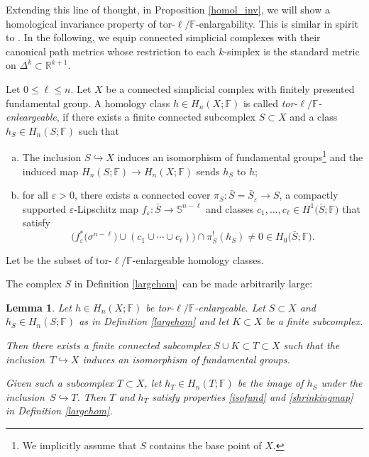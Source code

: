 \documentclass[pdftex]{sigma}
\numberwithin{equation}{section}
\newtheorem{Lemma}[Theorem]{Lemma}
\newcommand{\F}{\mathbb{F}}
\newcommand{\R}{\mathbb{R}}
\newcommand{\SSS}{\mathbb{S}}
\newcommand{\eps}{\varepsilon}
\begin{document}
Extending this line of thought, in Proposition \ref{homol_inv}, we will show a homological invariance property of tor-$\ell / \F$-enlargability.
This is similar in spirit to \cite[Section 3]{BH10}.
In the following, we equip connected simplicial complexes with their canonical path metrics whose restriction to each $k$-simplex is the standard metric on $\Delta^k \subset \R^{k+1}$.

\begin{Definition} \label{largehom}
Let $0 \leq \ell \leq n$.
Let $X$ be a connected simplicial complex with finitely presented fundamental group.
A homology class $h \in H_n(X; \F)$ is called {\em tor-$\ell / \F$-enleargeable}, if there exists a finite connected subcomplex $S \subset X$ and a class $h_S \in H_n(S; \F)$ such that
\begin{enumerate}[(a)]\itemsep=0pt
\item \label{isofund} The inclusion $S \hookrightarrow X$ induces an isomorphism of fundamental groups\footnote{We implicitly assume that $S$ contains the base point of $X$.} and the induced map $H_n(S ; \F) \to H_n(X; \F)$ sends $h_S$ to $h$;
\item \label{shrinkingmap} for all $\eps > 0$, there exists a connected cover $\pi_S \colon \bar S = \bar S_\eps \to S$, a compactly supported $\eps$-Lipschitz map $f_\eps \colon \bar S \to \SSS^{n-\ell}$ and classes $c_1 , \ldots, c_\ell \in H^1\big(\bar S; \F\big)$ that satisfy
 \begin{equation*}
 \big( f_\eps^*\big(\sigma^{n-\ell}\big) \cup (c_1 \cup \cdots \cup c_\ell) \big) \cap \pi_S^!(h_S) \neq 0 \in H_{0}\big(\bar S; \F\big) .
\end{equation*}
\end{enumerate}
Let
\smash{$
 H_*^{\text{\rm tor-}\ell/\F\text{\rm-enl}}(X; \F) \subset H_*(X ; \F)
$}
be the subset of tor-$\ell/\F$-enlargeable homology classes.
\end{Definition}

The complex $S$ in Definition \ref{largehom} can be made arbitrarily large:

\begin{Lemma} \label{subcomplexinv} Let $h\in H_n(X; \F)$ be tor-$\ell / \F$-enlargeable.
Let $S \subset X$ and $h_S \in H_n(S;\F)$ as in Definition {\rm\ref{largehom}} and let $K \subset X$ be a finite subcomplex.

Then there exists a finite connected subcomplex $S \cup K \subset T \subset X$ such that the inclusion~${T \hookrightarrow X}$ induces an isomorphism of fundamental groups.

Given such a subcomplex $T \subset X$, let $h_T \in H_n(T; \F)$ be the image of $h_S$ under the inclusion~${S \hookrightarrow T}$.
Then $T$ and $h_T$ satisfy properties {\rm\ref{isofund}} and {\rm\ref{shrinkingmap}} in Definition {\rm\ref{largehom}}.
\end{Lemma}
\end{document}
